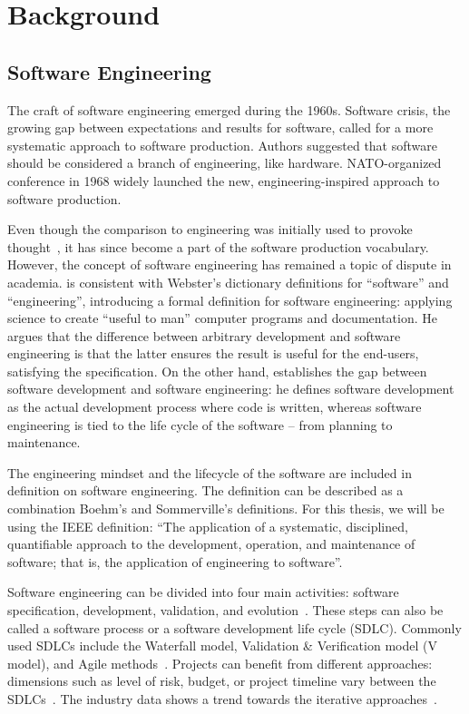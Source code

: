\chapter{Background}

\section{Software Engineering}

The craft of software engineering emerged during the 1960s. Software crisis, the growing gap between expectations and results for software, called for a more systematic approach to software production. Authors suggested that software should be considered a branch of engineering, like hardware. NATO-organized conference in 1968 widely launched the new, engineering-inspired approach to software production.~\cite{naur_peter_software_1969}

Even though the comparison to engineering was initially used to provoke thought~\cite{naur_peter_software_1969}, it has since become a part of the software production vocabulary. However, the concept of software engineering has remained a topic of dispute in academia. \citet{boehm_software_1979} is consistent with Webster's dictionary definitions for ``software'' and ``engineering'', introducing a formal definition for software engineering: applying science to create ``useful to man'' computer programs and documentation. He argues that the difference between arbitrary development and software engineering is that the latter ensures the result is useful for the end-users, satisfying the specification. On the other hand, \citet{sommerville_software_2016} establishes the gap between software development and software engineering: he defines software development as the actual development process where code is written, whereas software engineering is tied to the life cycle of the software – from planning to maintenance.

The engineering mindset and the lifecycle of the software are included in \citet{ieee_ieee_1990} definition on software engineering. The definition can be described as a combination Boehm's and Sommerville's definitions. For this thesis, we will be using the IEEE definition: ``The application of a systematic, disciplined, quantifiable approach to the development, operation, and maintenance of software; that is, the application of engineering to software''.

Software engineering can be divided into four main activities: software specification, development, validation, and evolution~\cite{sommerville_software_2016}. These steps can also be called a software process or a software development life cycle (SDLC). Commonly used SDLCs include the Waterfall model, Validation \& Verification model (V model), and Agile methods~\cite{balaji_waterfall_2012}. Projects can benefit from different approaches: dimensions such as level of risk, budget, or project timeline vary between the SDLCs~\cite{alshamrani_comparison_2015, cohen_introduction_2004}. The industry data shows a trend towards the iterative approaches~\cite{sommerville_software_2016}. 

